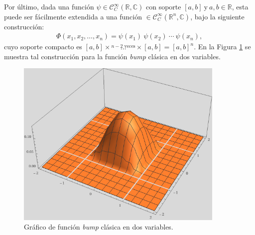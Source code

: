 \documentclass[spanish, fleqn]{article}
\begin{document}
\begin{description}
\begin{enumerate}
    \end{enumerate}

    Por último, dada una función $\psi \in \mathcal{C}_{C}^{\infty}(\mathbb{R},\mathbb{C})$ con soporte $[a,b] \ \text{y} \ a,b \in \mathbb{R}$, esta puede ser fácilmente extendida a una función $\in \mathcal{C}_{C}^{\infty}(\mathbb{R}^n,\mathbb{C})$, bajo la siguiente construcción:
    \begin{align}
    \Phi(x_1,x_2,\ldots,x_n) = \psi(x_1)\ \psi(x_2)\ \cdots \ \psi(x_n),
    \label{eq:ndbump}
    \end{align}
    cuyo soporte compacto es $[a,b]\times \stackrel{n-2 \text{ veces}}{\ldots} \times [a,b]=[a,b]^n$. En la Figura \ref{fig:3dbump} se muestra tal construcción para la función \textit{bump} clásica en dos variables.
    
    \begin{figure}[htpb!]
    \centering
    \includegraphics[width=10cm]{3dbump}
    \caption{Gráfico de función \textit{bump} clásica en dos variables.}
    \label{fig:3dbump}
    \end{figure}




\end{description}
\end{document}
